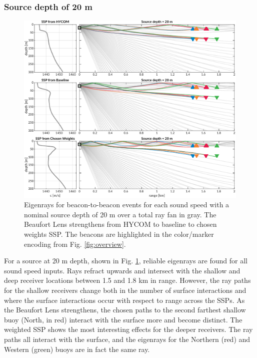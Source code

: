 \documentclass[preprint,TurnOnLineNumbers]{JASA}
\begin{document}
\subsubsection{Source depth of 20 m}
\begin{figure}[ht!]
  \centering
  \includegraphics[width=\columnwidth]{Fig6.pdf}
  \caption{Eigenrays for beacon-to-beacon events for each sound speed with a nominal source depth of 20 m over a total ray fan in gray. The Beaufort Lens strengthens from HYCOM to baseline to chosen weights SSP. The beacons are highlighted in the color/marker encoding from Fig. \ref{fig:overview}.}
  \label{fig:raytrace-zs20}
\end{figure}

For a source at 20 m depth, shown in Fig. \ref{fig:raytrace-zs20}, reliable eigenrays are found for all sound speed inputs.
Rays refract upwards and intersect with the shallow and deep receiver locations between 1.5 and 1.8 km in range.
However, the ray paths for the shallow receivers change both in the number of surface interactions and where the surface interactions occur with respect to range across the SSPs.
As the Beaufort Lens strengthens, the chosen paths to the second farthest shallow buoy (North, in red) interact with the surface more and become distinct.
The weighted SSP shows the most interesting effects for the deeper receivers.
The ray paths all interact with the surface, and the eigenrays for the Northern (red) and Western (green) buoys are in fact the same ray.
\end{document}

